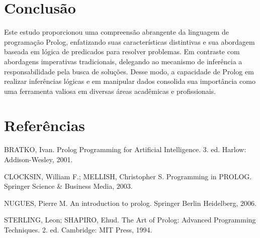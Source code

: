 \documentclass[12pt]{article}
\begin{document}
\section{Conclusão}

Este estudo proporcionou uma compreensão abrangente da linguagem de programação Prolog, enfatizando suas características distintivas e sua abordagem baseada em lógica de predicados para resolver problemas. Em contraste com abordagens imperativas tradicionais, delegando ao mecanismo de inferência a responsabilidade pela busca de soluções. Desse modo, a capacidade de Prolog em realizar inferências lógicas e em manipular dados consolida sua importância como uma ferramenta valiosa em diversas áreas acadêmicas e profissionais.

\section*{Referências}

\renewcommand{\baselinestretch}{1.5}

\setlength{\parindent}{0pt}

\hangindent=0.5cm
BRATKO, Ivan. Prolog Programming for Artificial Intelligence. 3. ed. Harlow: Addison-Wesley, 2001.

\hangindent=0.5cm
CLOCKSIN, William F.; MELLISH, Christopher S. Programming in PROLOG. Springer Science \& Business Media, 2003.

\hangindent=0.5cm
NUGUES, Pierre M. An introduction to prolog. Springer Berlin Heidelberg, 2006.

\hangindent=0.5cm
STERLING, Leon; SHAPIRO, Ehud. The Art of Prolog: Advanced Programming Techniques. 2. ed. Cambridge: MIT Press, 1994.
\end{document}
